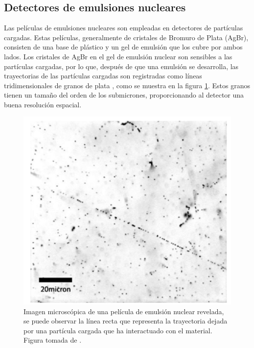 \documentclass[12pt,oneside,openany,letter]{book}
\begin{document}
\subsection{Detectores de emulsiones nucleares}
Las pel\'iculas de emulsiones nucleares son empleadas en detectores de part\'iculas cargadas. Estas pel\'iculas, generalmente de cristales de Bromuro de Plata (AgBr), consisten de una base de pl\'astico y un gel de emulsi\'on que los cubre por ambos lados. Los cristales de AgBr en el gel de emulsi\'on nuclear son sensibles a las part\'iculas cargadas, por lo que, despu\'es de que una emulsi\'on se desarrolla, las trayectorias de las part\'iculas cargadas son registradas como l\'ineas tridimensionales de granos de plata \cite{nishiyama2014experimental}, como se muestra en la figura \ref{emulsion}. Estos granos tienen un tama\~no del orden de los submicrones, proporcionando al detector una buena resoluci\'on espacial.
\begin{figure}
\begin{center}
\includegraphics[scale=0.6]{emulsion.png}
\caption[Imagen microsc\'opica de una pel\'icula de emulsi\'on nuclear revelada]{Imagen microsc\'opica de una pel\'icula de emulsi\'on nuclear revelada, se puede observar la l\'inea recta que representa la trayectoria dejada por una part\'icula cargada que ha interactuado con el material. Figura tomada de \cite{nishiyama2014experimental}.}
\label{emulsion}
\end{center}
\end{figure}
\end{document}
